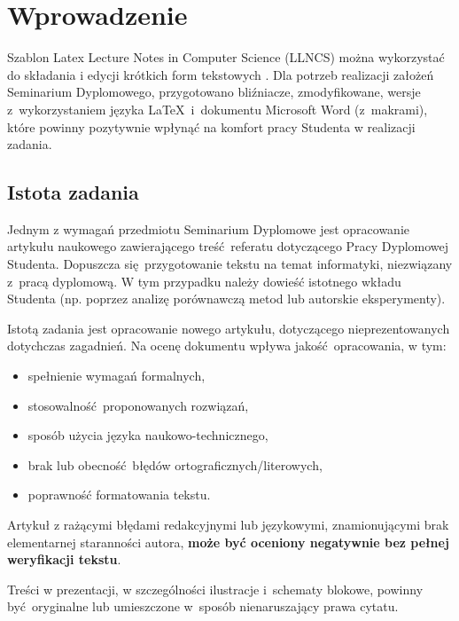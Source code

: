 \section{Wprowadzenie}
\label{sec:intro}

Szablon Latex Lecture Notes in Computer Science (LLNCS) można wykorzystać do składania i edycji krótkich form tekstowych \cite{ref:llncs}. Dla potrzeb realizacji założeń Seminarium Dyplomowego, przygotowano bliźniacze, zmodyfikowane, wersje z~wykorzystaniem języka \LaTeX~i~dokumentu Microsoft Word (z~makrami), które powinny pozytywnie wpłynąć na komfort pracy Studenta w realizacji zadania.

\subsection{Istota zadania}
\label{subsec:essence}

Jednym z wymagań przedmiotu Seminarium Dyplomowe jest opracowanie artykułu naukowego zawierającego treść referatu dotyczącego Pracy Dyplomowej Studenta. Dopuszcza się przygotowanie tekstu na temat informatyki, niezwiązany z~pracą dyplomową. W tym przypadku należy dowieść istotnego wkładu Studenta (np. poprzez analizę porównawczą metod lub autorskie eksperymenty).

Istotą zadania jest opracowanie nowego artykułu, dotyczącego nieprezentowanych dotychczas zagadnień. Na ocenę dokumentu wpływa jakość opracowania, w tym:

\begin{itemize}[noitemsep]
	\item spełnienie wymagań formalnych,
	\item stosowalność proponowanych rozwiązań,
	\item sposób użycia języka naukowo-technicznego,
	\item brak lub obecność błędów ortograficznych/literowych,
	\item poprawność formatowania tekstu.
\end{itemize}

\begin{note}
	Artykuł z rażącymi błędami redakcyjnymi lub językowymi, znamionującymi brak elementarnej staranności autora, \textbf{może być oceniony negatywnie bez pełnej weryfikacji tekstu}.
\end{note}

\begin{note}
	Treści w prezentacji, w szczególności ilustracje i~schematy blokowe, powinny być oryginalne lub umieszczone w~sposób nienaruszający prawa cytatu.
\end{note}

